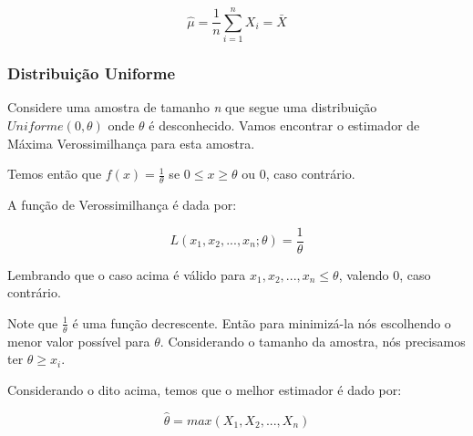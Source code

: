 \begin{equation}
\hat{\mu} = \frac{1}{n}\sum_{i=1}^{n}X_{i} = \bar{X}
\end{equation}

\subsubsection{Distribuição Uniforme}

Considere uma amostra de tamanho \emph{n} que segue uma distribuição \begin{math} Uniforme(0, \theta) \end{math} onde \begin{math} \theta \end{math} é desconhecido. Vamos encontrar o estimador de Máxima Verossimilhança para esta amostra.

Temos então que \begin{math}f(x) = \frac{1}{\theta} \end{math} se \begin{math} 0\leq x \geq \theta \end{math} ou 0, caso contrário.

A função de Verossimilhança é dada por:

\begin{equation}
L(x_{1}, x_{2}, ..., x_{n}; \theta) = \frac{1}{\theta}  
\end{equation}

Lembrando que o caso acima é válido para \begin{math} x_{1}, x_{2}, ..., x_{n} \leq \theta \end{math}, valendo 0, caso contrário.

Note que \begin{math} \frac{1}{\theta} \end{math} é uma função decrescente. Então para minimizá-la nós escolhendo o menor valor possível para \begin{math} \theta \end{math}. Considerando o tamanho da amostra, nós precisamos ter \begin{math} \theta \geq x_{i} \end{math}.

Considerando o dito acima, temos que o melhor estimador é dado por:

\begin{equation}
	\hat{\theta} = max(X_{1}, X_{2}, ..., X_{n})
\end{equation}

